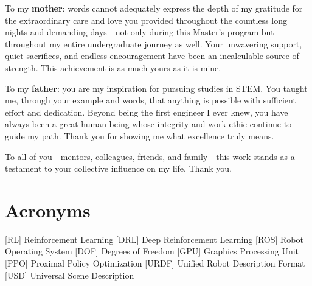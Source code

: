 \documentclass[12pt,a4paper]{article}
\begin{document}
To my \textbf{mother}: words cannot adequately express the depth of my gratitude for the extraordinary care and love you provided throughout the countless long nights and demanding days---not only during this Master's program but throughout my entire undergraduate journey as well. Your unwavering support, quiet sacrifices, and endless encouragement have been an incalculable source of strength. This achievement is as much yours as it is mine.

To my \textbf{father}: you are my inspiration for pursuing studies in STEM. You taught me, through your example and words, that anything is possible with sufficient effort and dedication. Beyond being the first engineer I ever knew, you have always been a great human being whose integrity and work ethic continue to guide my path. Thank you for showing me what excellence truly means.

\vspace{0.5cm}
\noindent To all of you---mentors, colleagues, friends, and family---this work stands as a testament to your collective influence on my life. Thank you.



\newpage



\tableofcontents

\newpage



\listoftables

\newpage



\listoffigures

\newpage

\section*{Acronyms}

\begin{acronym} [PCNA]
      [RL]    {Reinforcement Learning}
     [DRL]   {Deep Reinforcement Learning}
     [ROS]   {Robot Operating System}
     [DOF]   {Degrees of Freedom}
     [GPU]   {Graphics Processing Unit}
     [PPO]   {Proximal Policy Optimization}
    [URDF]  {Unified Robot Description Format}
     [USD]   {Universal Scene Description}
\end{acronym}
\end{document}
